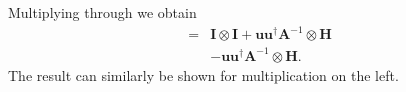  Multiplying through we obtain
 \begin{align}
 =& \mathbf{I} \otimes \mathbf{I} + \mathbf{u}\mathbf{u}^\dagger\mathbf{A}^{-1} \otimes \mathbf{H} \nonumber 
\\ &- \mathbf{u}\mathbf{u}^\dagger\mathbf{A}^{-1} \otimes \mathbf{H}.
\end{align}
The result can similarly be shown for multiplication on the left.


